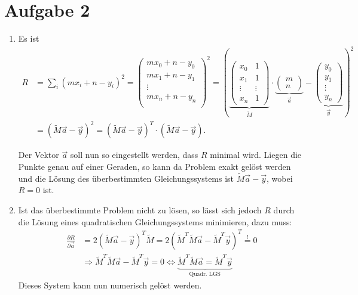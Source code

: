 \section*{Aufgabe 2}

\begin{enumerate}[label=\alph*)]
    \item 
    Es ist 
    \begin{align*}
        R &= \sum_i (mx_i+n-y_i)^2
        =
        \begin{pmatrix}
            mx_0 + n - y_0 \\
            mx_1 + n - y_1 \\
            \vdots\\
            mx_n + n - y_n \\
        \end{pmatrix}^2
        =
        \left(
        \underbrace{
        \begin{pmatrix}
            x_0 & 1 \\
            x_1 & 1 \\
            \vdots & \vdots \\
            x_n & 1
        \end{pmatrix}}_{\tilde M}
        \cdot
        \underbrace{
        \begin{pmatrix}
            m\\n
        \end{pmatrix}}_{\vec a}
        - 
        \underbrace{
        \begin{pmatrix}
            y_0 \\ y_1 \\ \vdots \\ y_n
        \end{pmatrix}}_{\vec y}\right)^2\\
        &= (\tilde M\vec a - \vec y)^2
        = (\tilde M\vec a - \vec y)^T\cdot (\tilde M\vec a - \vec y).
    \end{align*}
    
    
    Der Vektor $\vec a$ soll nun so eingestellt werden, dass $R$ minimal wird.
    Liegen die Punkte genau auf einer Geraden, so kann da Problem exakt gelöst werden und die Lösung des überbestimmten Gleichungssystems ist
    $\tilde M \vec a - \vec y$, wobei $R=0$ ist.
    \item
    Ist das überbestimmte Problem nicht zu lösen, 
    so lässt sich jedoch $R$ durch die Lösung eines quadratischen Gleichungssystems minimieren, dazu muss:
    \begin{align*}
        \frac{\partial R}{\partial \vec a}
        &=
        2 (\tilde M\vec a - \vec y)^T \tilde M
        = 2 (\tilde M^T\tilde M\vec a - \tilde M^T\vec y)^T
        \overset{!}{=} 0\\
        &\Rightarrow 
        \tilde M^T\tilde M\vec a - \tilde M^T\vec y = 0
        \Leftrightarrow 
        \underbrace{\tilde M^T\tilde M\vec a = \tilde M^T\vec y}_{
            \text{Quadr. LGS}
        }
    \end{align*}
     Dieses System kann nun numerisch gelöst werden.
    

\end{enumerate}
